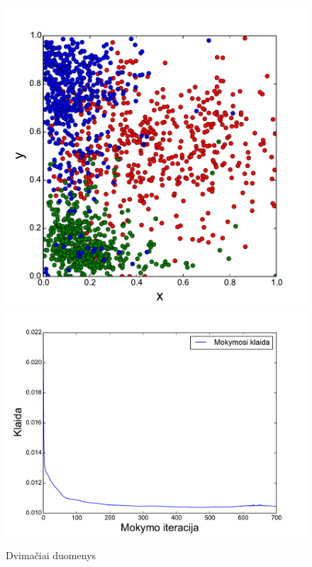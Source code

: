 \documentclass{VUMIFPSbakalaurinis}
\begin{document}
\begin{figure}
	\includegraphics[scale=0.5]{pics/points_2d}
	\includegraphics[scale=0.5]{pics/points_2d_progress}
	\caption{Dvimačiai duomenys}
	\label{fig:2d_points}
\end{figure}
\end{document}
